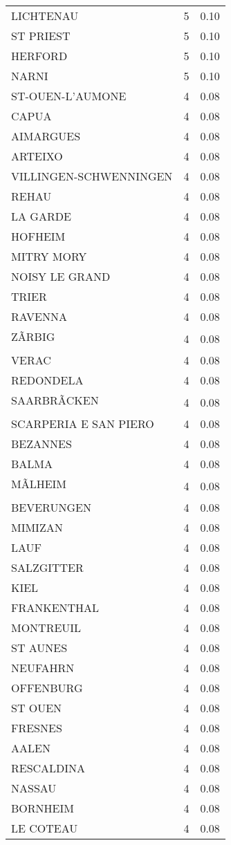 \begin{table*}[htbp]
\begin{tabular}{lrr}
LICHTENAU & 5 & 0.10 \\
ST PRIEST & 5 & 0.10 \\
HERFORD & 5 & 0.10 \\
NARNI & 5 & 0.10 \\
ST-OUEN-L'AUMONE & 4 & 0.08 \\
CAPUA & 4 & 0.08 \\
AIMARGUES & 4 & 0.08 \\
ARTEIXO & 4 & 0.08 \\
VILLINGEN-SCHWENNINGEN & 4 & 0.08 \\
REHAU & 4 & 0.08 \\
LA GARDE & 4 & 0.08 \\
HOFHEIM & 4 & 0.08 \\
MITRY MORY & 4 & 0.08 \\
NOISY LE GRAND & 4 & 0.08 \\
TRIER & 4 & 0.08 \\
RAVENNA & 4 & 0.08 \\
ZÃRBIG & 4 & 0.08 \\
VERAC & 4 & 0.08 \\
REDONDELA & 4 & 0.08 \\
SAARBRÃCKEN & 4 & 0.08 \\
SCARPERIA E SAN PIERO & 4 & 0.08 \\
BEZANNES & 4 & 0.08 \\
BALMA & 4 & 0.08 \\
MÃLHEIM & 4 & 0.08 \\
BEVERUNGEN & 4 & 0.08 \\
MIMIZAN & 4 & 0.08 \\
LAUF & 4 & 0.08 \\
SALZGITTER & 4 & 0.08 \\
KIEL & 4 & 0.08 \\
FRANKENTHAL & 4 & 0.08 \\
MONTREUIL & 4 & 0.08 \\
ST AUNES & 4 & 0.08 \\
NEUFAHRN & 4 & 0.08 \\
OFFENBURG & 4 & 0.08 \\
ST OUEN & 4 & 0.08 \\
FRESNES & 4 & 0.08 \\
AALEN & 4 & 0.08 \\
RESCALDINA & 4 & 0.08 \\
NASSAU & 4 & 0.08 \\
BORNHEIM & 4 & 0.08 \\
LE COTEAU & 4 & 0.08 \\

\end{tabular}
\end{table*}
